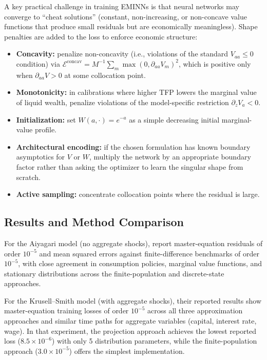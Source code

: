 \documentclass[11pt,a4paper]{report}
\begin{document}
A key practical challenge in training EMINNs is that neural networks may converge to ``cheat solutions'' (constant, non-increasing, or non-concave value functions that produce small residuals but are economically meaningless).  Shape penalties are added to the loss to enforce economic structure:
\begin{itemize}[itemsep=2pt]
\item \textbf{Concavity:} penalize non-concavity (i.e., violations of the standard $V_{aa}\leq 0$ condition) via $\mathcal{E}^{\text{concav}} = M^{-1}\sum_m \max(0, \partial_{aa}V_m)^2$, which is positive only when $\partial_{aa}V > 0$ at some collocation point.
\item \textbf{Monotonicity:} in calibrations where higher TFP lowers the marginal value of liquid wealth, penalize violations of the model-specific restriction $\partial_z V_a < 0$.
\item \textbf{Initialization:} set $W(a,\cdot) = e^{-a}$ as a simple decreasing initial marginal-value profile.
\item \textbf{Architectural encoding:} if the chosen formulation has known boundary asymptotics for $V$ or $W$, multiply the network by an appropriate boundary factor rather than asking the optimizer to learn the singular shape from scratch.
\item \textbf{Active sampling:} concentrate collocation points where the residual is large.
\end{itemize}

\subsection{Results and Method Comparison}

For the Aiyagari model (no aggregate shocks), \citet{gu2024masterequations} report master-equation residuals of order $10^{-5}$ and mean squared errors against finite-difference benchmarks of order $10^{-5}$, with close agreement in consumption policies, marginal value functions, and stationary distributions across the finite-population and discrete-state approaches.

For the Krusell--Smith model (with aggregate shocks), their reported results show master-equation training losses of order $10^{-5}$ across all three approximation approaches and similar time paths for aggregate variables (capital, interest rate, wage).  In that experiment, the projection approach achieves the lowest reported loss ($8.5 \times 10^{-6}$) with only 5 distribution parameters, while the finite-population approach ($3.0 \times 10^{-5}$) offers the simplest implementation.
\end{document}
